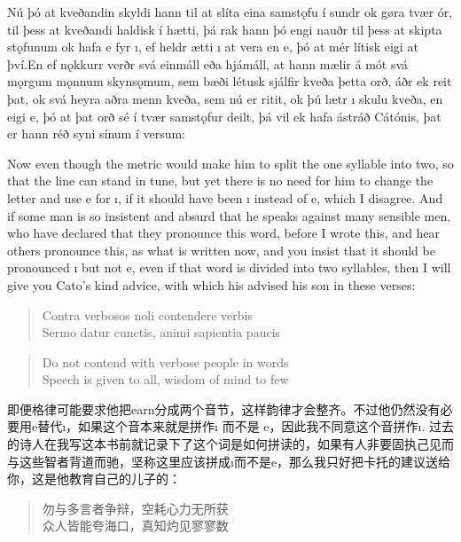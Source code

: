 \begin{paracol}{2}
    Nú þó at kveðandin skyldi hann til at slíta eina samstǫfu í sundr ok gøra tvær ór, til þess at kveðandi haldisk í hætti, þá rak hann þó engi nauðr til þess at skipta stǫfunum ok hafa e fyr ı, ef heldr ætti ı at vera en e, þó at mér lítisk eigi at því.\footnotemark En ef nǫkkurr verðr svá einmáll eða hjámáll, at hann mælir á mót svá mǫrgum mǫnnum skynsǫmum, sem bæði létusk sjálfir kveða þetta orð, áðr ek reit þat, ok svá heyra aðra menn kveða, sem nú er ritit, ok þú lætr ı skulu kveða, en eigi e, þó at þat orð sé í tvær samstǫfur deilt, þá vil ek hafa ástráð Cátónis, þat er hann réð syni sínum í versum:

    \switchcolumn
    Now even though the metric would make him to split the one syllable into two, so that the line can stand in tune, but yet there is no need for him to change the letter and use e for ı, if it should have been ı instead of e, which I disagree. And if some man is so insistent and absurd that he speaks against many sensible men, who have declared that they pronounce this word, before I wrote this, and hear others pronounce this, as what is written now, and you insist that it should be pronounced ı but not e, even if that word is divided into two syllables, then I will give you Cato's kind advice, with which his advised his son in these verses:

    \switchcolumn*

    \begin{quote}
        Contra verbosos noli contendere verbis\\
        Sermo datur cunctis, animi sapientia paucis
    \end{quote}

    \switchcolumn

    \begin{quote}
        Do not contend with verbose people in words\\ Speech is given to all, wisdom of mind to few
    \end{quote}

\end{paracol}
\begin{translation*}{}
    即便格律可能要求他把earn分成两个音节，这样韵律才会整齐。不过他仍然没有必要用e替代ı，如果这个音本来就是拼作ı 而不是 e，因此我不同意这个音拼作ı. 过去的诗人在我写这本书前就记录下了这个词是如何拼读的，如果有人非要固执己见而与这些智者背道而驰，坚称这里应该拼成ı而不是e，那么我只好把卡托的建议送给你，这是他教育自己的儿子的：
    \begin{quote}
        勿与多言者争辩，空耗心力无所获\\
        众人皆能夸海口，真知灼见寥寥数
    \end{quote}

\end{translation*}

